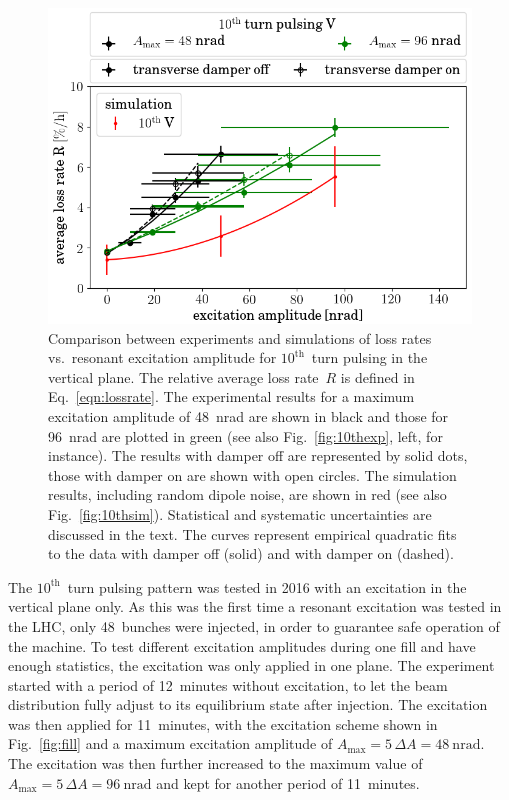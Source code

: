 \documentclass[%
 reprint,
 amsmath,amssymb,
 aps,
prstab,
longbibliography
]{revtex4-1}
\newcommand{\q}[2]{\ensuremath{#1\ \mathrm{#2}}} %
\begin{document}
\begin{figure}
  \centering
  \includegraphics[width=\linewidth]{2016_scale_amp_10v_ran_lblshort_sim_prstab.png}
  \caption{Comparison between experiments and simulations of loss
    rates vs.\ resonant excitation amplitude for
    $10^{\mathrm{th}}$~turn pulsing in the vertical plane. The
    relative average loss rate~$R$ is defined in
    Eq.~\ref{eqn:lossrate}. The experimental results for a maximum
    excitation amplitude of 48~nrad are shown in black and those for
    96~nrad are plotted in green (see also Fig.~\ref{fig:10thexp},
    left, for instance). The results with damper off are represented
    by solid dots, those with damper on are shown with open
    circles. The simulation results, including random dipole noise,
    are shown in red (see also Fig.~\ref{fig:10thsim}). Statistical
    and systematic uncertainties are discussed in the text. The curves
    represent empirical quadratic fits to the data with damper off
    (solid) and with damper on (dashed).}
  \label{fig:10thexploss}
\end{figure}


The $10^{\mathrm{th}}$~turn pulsing pattern was tested in 2016 with an
excitation in the vertical plane only. As this was the first time a
resonant excitation was tested in the LHC, only 48~bunches were
injected, in order to guarantee safe operation of the machine. To test
different excitation amplitudes during one fill and have enough
statistics, the excitation was only applied in one plane. The
experiment started with a period of 12~minutes without excitation, to
let the beam distribution fully adjust to its equilibrium state after
injection. The excitation was then applied for 11~minutes, with the
excitation scheme shown in Fig.~\ref{fig:fill} and a maximum
excitation amplitude of
$A_{\mathrm{max}} = 5 \, \Delta A = \q{48}{nrad}$. The excitation was
then further increased to the maximum value of
$A_{\mathrm{max}} = 5 \, \Delta A = \q{96}{nrad}$ and kept for another
period of 11~minutes.
\end{document}
